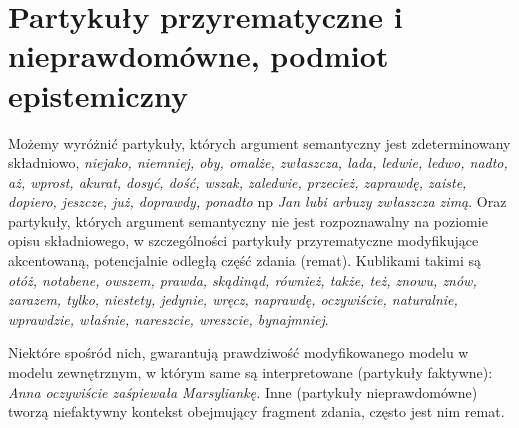 \documentclass[a4paper,12pt]{article}
\begin{document}

\section{Partykuły przyrematyczne i nieprawdomówne, podmiot epistemiczny}
Możemy wyróżnić partykuły, których argument semantyczny jest zdeterminowany składniowo,
{\it niejako, niemniej, oby, omalże, zwłaszcza, lada, ledwie, ledwo, nadto,
aż, wprost, akurat, dosyć, dość, wszak, zaledwie, przecież, zaprawdę, zaiste,
dopiero, jeszcze, już, doprawdy, ponadto} 
np {\it Jan lubi arbuzy zwłaszcza zimą}.
Oraz partykuły, których argument semantyczny nie jest rozpoznawalny na poziomie 
opisu składniowego, w szczególności partykuły przyrematyczne 
modyfikujące akcentowaną, potencjalnie odległą część zdania (remat).%
Kublikami takimi są {\it otóż, notabene, owszem, prawda, skądinąd,
również, także, też, znowu, znów, zarazem, tylko, niestety, jedynie, wręcz,
naprawdę, oczywiście, naturalnie, wprawdzie, właśnie, nareszcie, wreszcie,
bynajmniej}. 

Niektóre spośród nich, gwarantują prawdziwość modyfikowanego 
modelu w modelu zewnętrznym, w którym same są interpretowane
(partykuły faktywne): %
{\it Anna oczywiście zaśpiewała Marsyliankę.}
Inne (partykuły nieprawdomówne) tworzą niefaktywny kontekst obejmujący fragment zdania,
często jest nim remat.
\end{document}

